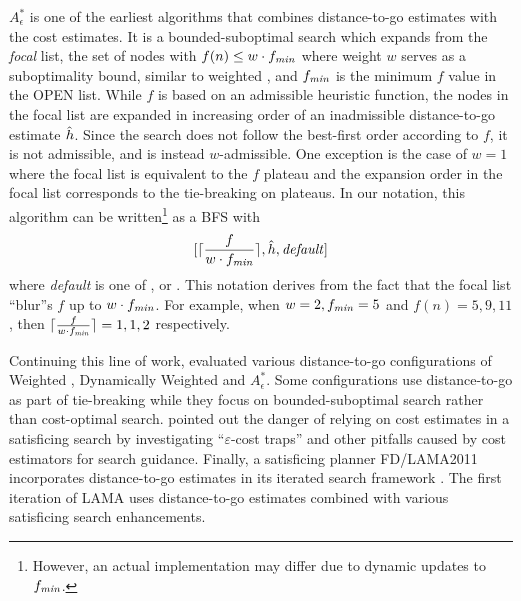 $A^*_\epsilon$ \cite{pearl1982studies} is one of
the earliest algorithms that combines distance-to-go estimates with the cost estimates. It is a bounded-suboptimal
search which expands from the \emph{focal} list, the set of nodes with $f(n)\leq w\cdot f_{\mit{min}}$ where weight $w$ serves as a suboptimality bound, similar to weighted \astar, 
 and $f_{\mit{min}}$ is the minimum $f$ value in the OPEN list.  While $f$
is based on an admissible heuristic function, the nodes in the focal list are expanded in increasing order of
an inadmissible distance-to-go estimate $\hh$. Since the search does not follow the best-first order according to $f$, it is 
not admissible, and is instead $w$-admissible. One exception is the case of $w=1$ where the focal list is equivalent
to the $f$ plateau and the expansion order in the focal list corresponds to the tie-breaking on plateaus. In our
notation, this algorithm can be written\footnote{
However, an actual implementation may differ due to dynamic updates to $f_{\mit{min}}$.}
as a BFS with
\[
 [ \lceil \frac{f}{w\cdot f_{\mit{min}}} \rceil, \hh, \mit{default}]
\]
where \textit{default} is one of \fifo, \lifo or \ro.
This notation derives from the fact that the focal list ``blur''s $f$ up to $w\cdot f_{\mit{min}}$.
For example, when $w=2, f_{\mit{min}}=5$ and
$f(n)=5,9,11$, then $\lceil \frac{f}{w\cdot f_{\mit{min}}} \rceil=1,1,2$ respectively. 

Continuing this line of work,  \citeyear{thayer2009using,thayer2011bounded}
evaluated various distance-to-go configurations of Weighted
\astar, Dynamically Weighted \astar \cite{pohl1973avoidance} and $A^*_\epsilon$.
Some configurations use distance-to-go as part of
tie-breaking while they focus on bounded-suboptimal search rather than cost-optimal search.
% 
 \citeyear{cushing2010cost} pointed out the danger of relying  %
on cost estimates in a satisficing search by investigating ``$\varepsilon$-cost traps'' and other pitfalls caused by
cost estimators for search guidance. %
% 
Finally, a \sota satisficing planner FD/LAMA2011 incorporates distance-to-go estimates in its iterated search
framework \cite{richter2011lama}. The first iteration of LAMA uses distance-to-go estimates combined with various satisficing
search enhancements.

